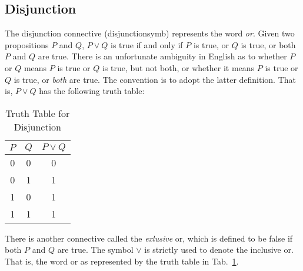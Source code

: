    \subsection{Disjunction}
        The disjunction connective (\gls{disjunctionsymb}) represents the word
        \textit{or}. Given two propositions $P$ and $Q$, $P\lor{Q}$ is true if
        and only if $P$ is true, or $Q$ is true, or both $P$ and $Q$ are true.
        There is an unfortunate ambiguity in English as to whether $P$ or $Q$
        means $P$ is true or $Q$ is true, but not both, or whether it means
        $P$ is true or $Q$ is true, or \textit{both} are true. The convention is
        to adopt the latter definition. That is, $P\lor{Q}$ has the following
        truth table:
        \begin{table}[H]
            \centering
            \captionsetup{type=table}
            \begin{tabular}{ccc}
                $P$&$Q$&$P\lor{Q}$\\
                \hline
                0&0&0\\
                0&1&1\\
                1&0&1\\
                1&1&1
            \end{tabular}
            \caption{Truth Table for Disjunction}
            \label{tab:Truth_Table_for_Disjunction}
        \end{table}
        There is another connective called the \textit{exlusive} or, which is
        defined to be false if both $P$ and $Q$ are true. The symbol $\lor$ is
        strictly used to denote the inclusive or. That is, the word or as
        represented by the truth table in
        Tab.~\ref{tab:Truth_Table_for_Disjunction}.

